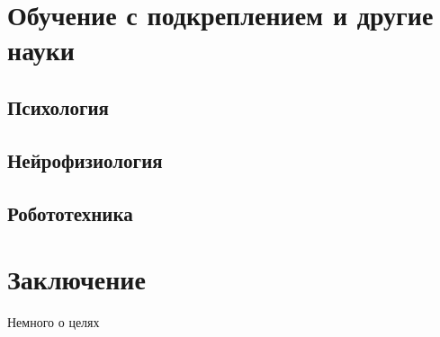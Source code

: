 \documentclass[11pt]{memoir}
\begin{document}
	
	\chapter{Обучение с подкреплением и другие науки}

		\section{Психология}
		
		\section{Нейрофизиология}

		\section{Робототехника}
	

	\chapter*{Заключение}
	Немного о целях
	\printbibliography
\end{document}

